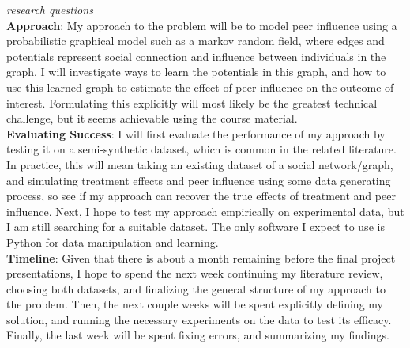 \documentclass{article}
\begin{document}
\textit{research questions} \\[1.0ex]
\textbf{Approach}: My approach to the problem will be to model peer influence using a probabilistic graphical model such as a markov random field, where edges and potentials represent social connection and influence between individuals in the graph. I will investigate ways to learn the potentials in this graph, and how to use this learned graph to estimate the effect of peer influence on the outcome of interest. Formulating this explicitly will most likely be the greatest technical challenge, but it seems achievable using the course material.   \\[1.0ex]
\textbf{Evaluating Success}: I will first evaluate the performance of my approach by testing it on a semi-synthetic dataset, which is common in the related literature. In practice, this will mean taking an existing dataset of a social network/graph, and simulating treatment effects and peer influence using some data generating process, so see if my approach can recover the true effects of treatment and peer influence. Next, I hope to test my approach empirically on experimental data, but I am still searching for a suitable dataset. The only software I expect to use is Python for data manipulation and learning. \\[1.0ex] 
\textbf{Timeline}: Given that there is about a month remaining before the final project presentations, I hope to spend the next week continuing my literature review, choosing both datasets, and finalizing the general structure of my approach to the problem. Then, the next couple weeks will be spent explicitly defining my solution, and running the necessary experiments on the data to test its efficacy. Finally, the last week will be spent fixing errors, and summarizing my findings.
\end{document}

